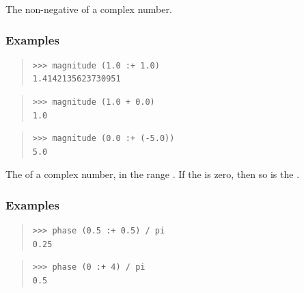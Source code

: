 \begin{haddockdesc}
\item[\begin{tabular}{@{}l}
magnitude :: RealFloat a => Complex a -> a
\end{tabular}]
{\haddockbegindoc
The non-negative  of a complex number.\par
\subsubsection*{\textbf{Examples}}
\begin{quote}
{\haddockverb\begin{verbatim}
>>> magnitude (1.0 :+ 1.0)
1.4142135623730951

\end{verbatim}}
\end{quote}
\begin{quote}
{\haddockverb\begin{verbatim}
>>> magnitude (1.0 + 0.0)
1.0

\end{verbatim}}
\end{quote}
\begin{quote}
{\haddockverb\begin{verbatim}
>>> magnitude (0.0 :+ (-5.0))
5.0

\end{verbatim}}
\end{quote}}
\end{haddockdesc}
\begin{haddockdesc}
\item[\begin{tabular}{@{}l}
phase :: RealFloat a => Complex a -> a
\end{tabular}]
{\haddockbegindoc
The  of a complex number, in the range .
 If the  is zero, then so is the .\par
\subsubsection*{\textbf{Examples}}
\begin{quote}
{\haddockverb\begin{verbatim}
>>> phase (0.5 :+ 0.5) / pi
0.25

\end{verbatim}}
\end{quote}
\begin{quote}
{\haddockverb\begin{verbatim}
>>> phase (0 :+ 4) / pi
0.5

\end{verbatim}}
\end{quote}}
\end{haddockdesc}
